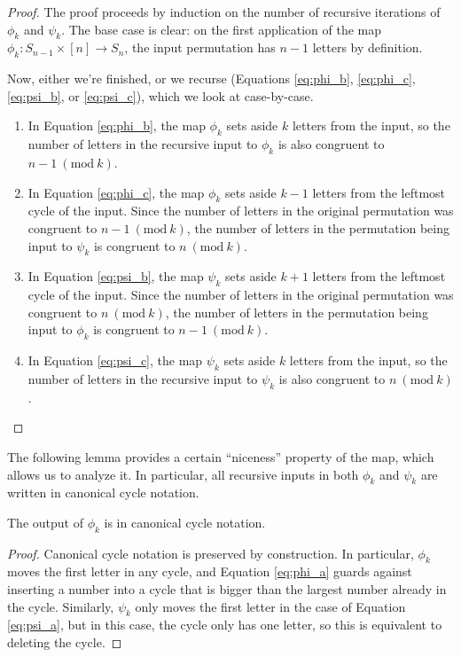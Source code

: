\begin{proof}
  The proof proceeds by induction on the number of recursive iterations of
  $\phi_k$ and $\psi_k$. The base case is clear: on the first application
  of the map
  $\phi_k \colon S_{n-1} \times [n] \rightarrow S_n$, the input permutation
  has $n-1$ letters by definition.

  Now, either we're finished, or we recurse
  (Equations \eqref{eq:phi_b}, \eqref{eq:phi_c}, \eqref{eq:psi_b}, or \eqref{eq:psi_c}),
  which we look at case-by-case.
  \begin{enumerate}[leftmargin=*, label={\textbf{Case \arabic*.}}]
    \item In Equation \eqref{eq:phi_b}, the map $\phi_k$ sets aside $k$ letters from the input, so the number of letters in the recursive input to $\phi_k$ is also congruent to $n - 1 \ (\mathrm{mod}\ k)$.
    \item In Equation \eqref{eq:phi_c}, the map $\phi_k$ sets aside $k - 1$ letters from the leftmost cycle of the input. Since the number of letters in the original permutation was congruent to $n-1 \ (\mathrm{mod}\ k)$, the number of letters in the permutation being input to $\psi_k$ is congruent to $n   \ (\mathrm{mod}\ k)$.
    \item In Equation \eqref{eq:psi_b}, the map $\psi_k$ sets aside $k + 1$ letters from the leftmost cycle of the input. Since the number of letters in the original permutation was congruent to $n   \ (\mathrm{mod}\ k)$, the number of letters in the permutation being input to $\phi_k$ is congruent to $n-1 \ (\mathrm{mod}\ k)$.
    \item In Equation \eqref{eq:psi_c}, the map $\psi_k$ sets aside $k$ letters from the input, so the number of letters in the recursive input to $\psi_k$ is also congruent to $n \ (\mathrm{mod}\ k)$.
  \end{enumerate}
\end{proof}
The following lemma provides a certain ``niceness'' property of the map,
which allows us to analyze it. In particular, all recursive inputs in both
$\phi_k$ and $\psi_k$ are written in canonical cycle notation.
\begin{lemma}
  The output of $\phi_k$ is in canonical cycle notation.
\end{lemma}
\begin{proof}
  Canonical cycle notation is preserved by construction.
  In particular, $\phi_k$ moves the first letter in any cycle, and
  Equation \eqref{eq:phi_a} guards against inserting a number into a cycle that
  is bigger than the largest number already in the cycle.
  Similarly, $\psi_k$ only moves the first letter in the case of Equation
  \eqref{eq:psi_a}, but in this case, the cycle only has one letter, so this is
  equivalent to deleting the cycle.
\end{proof}
